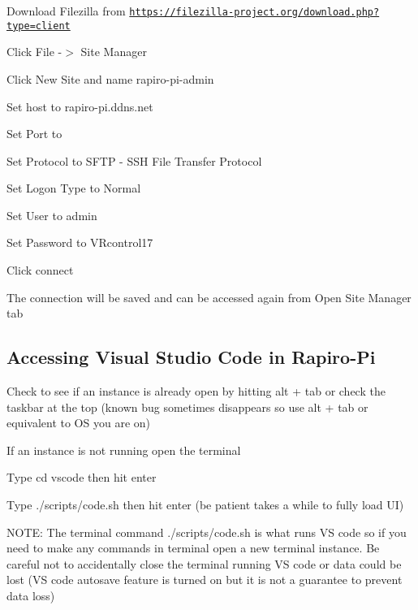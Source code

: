 \begin{DoxyEnumerate}
\item Download Filezilla from \href{https://filezilla-project.org/download.php?type=client}{\tt https\+://filezilla-\/project.\+org/download.\+php?type=client}
\item Click File -\/$>$ Site Manager
\item Click New Site and name {\ttfamily rapiro-\/pi-\/admin}
\item Set host to {\ttfamily rapiro-\/pi.\+ddns.\+net}
\item Set Port to {}
\item Set Protocol to {\ttfamily S\+F\+T\+P -\/ S\+S\+H File Transfer Protocol}
\item Set Logon Type to {\ttfamily Normal}
\item Set User to {\ttfamily admin}
\item Set Password to {\ttfamily V\+Rcontrol17}
\item Click connect
\end{DoxyEnumerate}

The connection will be saved and can be accessed again from Open Site Manager tab

\subsection*{Accessing Visual Studio Code in Rapiro-\/\+Pi}

Check to see if an instance is already open by hitting alt + tab or check the taskbar at the top (known bug sometimes disappears so use alt + tab or equivalent to O\+S you are on)


\begin{DoxyEnumerate}
\item If an instance is not running open the terminal
\item Type {\ttfamily cd vscode} then hit enter
\item Type {\ttfamily ./scripts/code.sh} then hit enter (be patient takes a while to fully load U\+I)
\end{DoxyEnumerate}

N\+O\+T\+E\+: The terminal command {\ttfamily ./scripts/code.sh} is what runs V\+S code so if you need to make any commands in terminal open a new terminal instance. Be careful not to accidentally close the terminal running V\+S code or data could be lost (V\+S code autosave feature is turned on but it is not a guarantee to prevent data loss) 